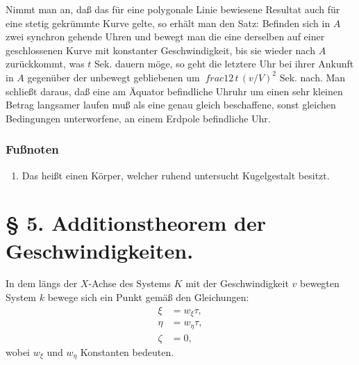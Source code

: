 \documentclass[17pt]{webarticle}       %
\begin{document}
Nimmt man an, daß das für eine polygonale Linie bewiesene Resultat auch für eine stetig gekrümmte Kurve gelte, so erhält man den Satz: Befinden sich in \( A \) zwei synchron gehende Uhren und bewegt man die eine derselben auf einer geschlossenen Kurve mit konstanter Geschwindigkeit, bis sie wieder nach \( A \) zurückkommt, was \( t \) Sek. dauern möge, so geht die letztere Uhr bei ihrer Ankunft in \( A \) gegenüber der unbewegt gebliebenen um \(\ frac{1}{2} \, t \, (v/V)^2 \) Sek. nach. Man schließt daraus, daß eine am Äquator befindliche Uhruhr um einen sehr kleinen Betrag langsamer laufen muß als eine genau gleich beschaffene, sonst gleichen Bedingungen unterworfene, an einem Erdpole befindliche Uhr.

\subsubsection*{Fußnoten}

\begin{enumerate}
\item\label{footnote-3} Das heißt einen Körper, welcher ruhend untersucht Kugelgestalt besitzt.
\end{enumerate}

\section*{§ 5. Additionstheorem der Geschwindigkeiten.}

In dem längs der \( X \)-Achse des Systems \( K \) mit der Geschwindigkeit \( v \) bewegten System \( k \) bewege sich ein Punkt gemäß den Gleichungen:
\[
\begin{aligned}
\xi &= w_\xi \tau,
\\
\eta &= w_\eta \tau,
\\
\zeta &= 0,
\end{aligned}
\]
wobei \( w_\xi \) und \( w_\eta \) Konstanten bedeuten.
\end{document}
